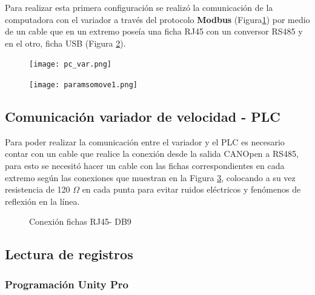 Para realizar esta primera configuración se realizó la comunicación de la computadora con el variador a través del protocolo \textbf{Modbus} (Figura\ref{fig:pcvar}) por medio de un cable que en un extremo poseía una ficha RJ45 con un conversor RS485 y en el otro, ficha USB (Figura \ref{fig:paramsomove1}). 
\begin{figure}[H]
	\centering
	\texttt{[image: pc\_var.png]}
	\label{fig:pcvar}
\end{figure}

\begin{figure}[H]
	\centering
	\texttt{[image: paramsomove1.png]}
	\label{fig:paramsomove1}
\end{figure}


\subsection{Comunicación variador de velocidad - PLC}
Para poder realizar la comunicación entre el variador y el PLC es necesario contar con un cable que realice la conexión desde la salida CANOpen a RS485, para esto se necesitó hacer un cable con las fichas correspondientes en cada extremo según las conexiones que muestran en la Figura \ref{fig:cable}, colocando a su vez resistencia de 120 $\Omega$ en cada punta para evitar ruidos eléctricos y fenómenos de reflexión en la línea.

\begin{figure}[htbp]
    \centering
    \caption{Conexión fichas RJ45- DB9} \label{fig:cable}
    \end{figure}


\subsection{Lectura de registros}


\subsubsection{Programación Unity Pro}


